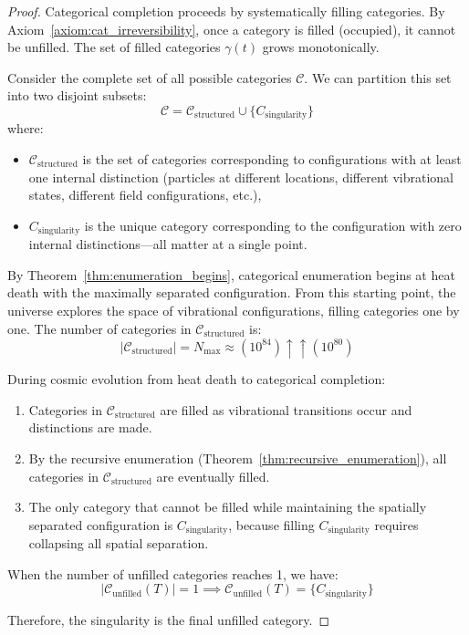 \documentclass[12pt,a4paper]{article}
\theoremstyle{definition}
\theoremstyle{remark}
\newcommand{\Nmax}{N_{\text{max}}}
\begin{document}
\begin{proof}
Categorical completion proceeds by systematically filling categories. By Axiom~\ref{axiom:cat_irreversibility}, once a category is filled (occupied), it cannot be unfilled. The set of filled categories $\gamma(t)$ grows monotonically.

Consider the complete set of all possible categories $\mathcal{C}$. We can partition this set into two disjoint subsets:
\begin{equation}
\mathcal{C} = \mathcal{C}_{\text{structured}} \cup \{C_{\text{singularity}}\}
\end{equation}
where:
\begin{itemize}
    \item $\mathcal{C}_{\text{structured}}$ is the set of categories corresponding to configurations with at least one internal distinction (particles at different locations, different vibrational states, different field configurations, etc.),
    \item $C_{\text{singularity}}$ is the unique category corresponding to the configuration with zero internal distinctions—all matter at a single point.
\end{itemize}

By Theorem~\ref{thm:enumeration_begins}, categorical enumeration begins at heat death with the maximally separated configuration. From this starting point, the universe explores the space of vibrational configurations, filling categories one by one. The number of categories in $\mathcal{C}_{\text{structured}}$ is:
\begin{equation}
|\mathcal{C}_{\text{structured}}| = \Nmax \approx (10^{84}) \uparrow\uparrow (10^{80})
\end{equation}

During cosmic evolution from heat death to categorical completion:
\begin{enumerate}
    \item Categories in $\mathcal{C}_{\text{structured}}$ are filled as vibrational transitions occur and distinctions are made.
    \item By the recursive enumeration (Theorem~\ref{thm:recursive_enumeration}), all categories in $\mathcal{C}_{\text{structured}}$ are eventually filled.
    \item The only category that cannot be filled while maintaining the spatially separated configuration is $C_{\text{singularity}}$, because filling $C_{\text{singularity}}$ requires collapsing all spatial separation.
\end{enumerate}

When the number of unfilled categories reaches 1, we have:
\begin{equation}
|\mathcal{C}_{\text{unfilled}}(T)| = 1 \implies \mathcal{C}_{\text{unfilled}}(T) = \{C_{\text{singularity}}\}
\end{equation}

Therefore, the singularity is the final unfilled category.
\end{proof}
\end{document}
